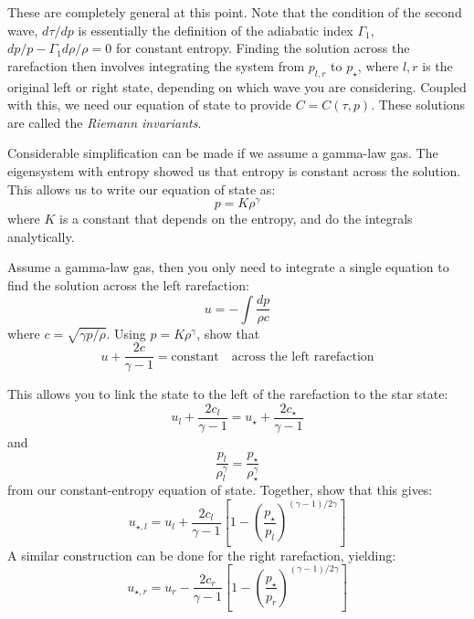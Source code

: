 These are completely general at this point.  Note that the condition
of the second wave, $d\tau/dp$ is essentially the definition of the
adiabatic index $\Gamma_1$, $dp/p - \Gamma_1 d\rho/\rho = 0$ for
constant entropy.  Finding the solution across the rarefaction then
involves integrating the system from $p_{l,r}$ to $p_\star$, where $l,
r$ is the original left or right state, depending on which wave you
are considering.  Coupled with this, we need our equation of state to
provide $C = C(\tau, p)$.  These solutions are called the {\em Riemann
  invariants}.

Considerable simplification can be made if we assume a gamma-law gas.
The eigensystem with entropy showed us that entropy is constant across
the solution.  This allows us to write our equation of state as:
\begin{equation}
p = K \rho^\gamma
\end{equation}
where $K$ is a constant that depends on the entropy, and do the 
integrals analytically.

\begin{exercise}
Assume a gamma-law gas, then you only need to integrate a single
equation to find the solution across the left rarefaction:
\begin{equation}
u = - \int \frac{dp}{\rho c}
\end{equation}
where $c = \sqrt{\gamma p/\rho}$.  Using $p = K\rho^\gamma$, show that
\begin{equation}
u + \frac{2c}{\gamma - 1} = \mbox{constant} \quad \mbox{across the left rarefaction}
\end{equation}

This allows you to link the state to the left of the rarefaction to the star state:
\begin{equation}
u_l + \frac{2c_l}{\gamma - 1} = u_\star + \frac{2c_\star}{\gamma -1}
\end{equation}
and
\begin{equation}
\frac{p_l}{\rho_l^\gamma} = \frac{p_\star}{\rho_\star^\gamma}
\end{equation}
from our constant-entropy equation of state.  Together, show that this
gives:
\begin{equation}
u_{\star,l} = u_l + \frac{2c_l}{\gamma - 1} \left [ 1 - \left ( \frac{p_\star}{p_l}\right )^{(\gamma - 1)/2\gamma} \right ]
\end{equation}
A similar construction can be done for the right rarefaction, yielding:
\begin{equation}
u_{\star,r} = u_r - \frac{2c_r}{\gamma - 1} \left [ 1 - \left ( \frac{p_\star}{p_r}\right )^{(\gamma - 1)/2\gamma} \right ]
\end{equation}

\end{exercise}

